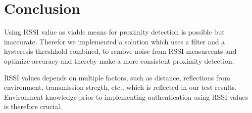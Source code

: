 \section{Conclusion}
Using RSSI value as viable means for proximity detection is possible but inaccurate. Therefor we implemented a solution which uses a filter and a hysteresis threshhold combined, to remove noise from RSSI measureents and optimize accuracy and thereby make a more consistent proximity detection.

RSSI values depends on multiple factors, such as distance, reflections from environment, transmission stregth, etc., which is reflected in our test results. Environment knowledge prior to implementing authentication using RSSI values is therefore crucial.

%

